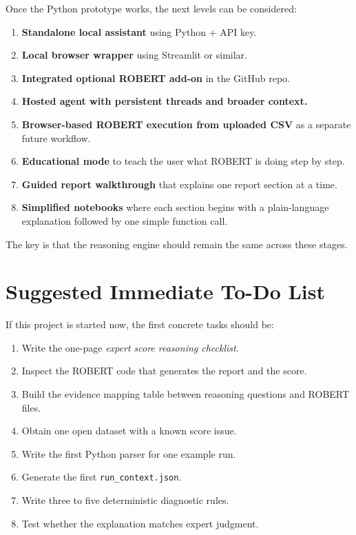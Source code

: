 \documentclass[11pt]{article}
\begin{document}
Once the Python prototype works, the next levels can be considered:

\begin{enumerate}
    \item \textbf{Standalone local assistant} using Python + API key.
    \item \textbf{Local browser wrapper} using Streamlit or similar.
    \item \textbf{Integrated optional ROBERT add-on} in the GitHub repo.
    \item \textbf{Hosted agent with persistent threads and broader context.}
    \item \textbf{Browser-based ROBERT execution from uploaded CSV} as a separate future workflow.
    \item \textbf{Educational mode} to teach the user what ROBERT is doing step by step.
    \item \textbf{Guided report walkthrough} that explains one report section at a time.
    \item \textbf{Simplified notebooks} where each section begins with a plain-language explanation followed by one simple function call.
\end{enumerate}

The key is that the reasoning engine should remain the same across these stages.

\section{Suggested Immediate To-Do List}
If this project is started now, the first concrete tasks should be:

\begin{enumerate}
    \item Write the one-page \textit{expert score reasoning checklist}.
    \item Inspect the ROBERT code that generates the report and the score.
    \item Build the evidence mapping table between reasoning questions and ROBERT files.
    \item Obtain one open dataset with a known score issue.
    \item Write the first Python parser for one example run.
    \item Generate the first \texttt{run\_context.json}.
    \item Write three to five deterministic diagnostic rules.
    \item Test whether the explanation matches expert judgment.
\end{enumerate}
\end{document}
